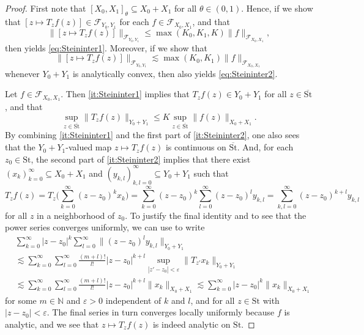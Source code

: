 \documentclass{amsart}
\newcommand {\veps}{\varepsilon}
\newcommand {\F}{\mathcal{F}}
\newcommand {\N}{{\mathbb N}}
\newcommand {\St}{{\mathrm{St}}}
\theoremstyle{definition}
\numberwithin{equation}{section}
\begin{document}
\begin{proof}
First note that $[X_{0},X_{1}]_{\theta}\subseteq X_{0}+X_{1}$ for all $\theta\in(0,1)$. Hence, if we show that $[z\mapsto T_{z}f(z)]\in \F_{Y_{0},Y_{1}}$ for each $f\in\F_{X_{0},X_{1}}$, and that
\[
\|[z\mapsto T_{z}f(z)]\|_{\F_{Y_{0},Y_{1}}}\leq \max(K_{0},K_{1},K)\|f\|_{\F_{X_{0},X_{1}}},
\] 
then \cite[Lemma 2.2]{Kalton-Mitrea98} yields \eqref{eq:Steininter1}. Moreover, if we show that 
\[
\|[z\mapsto T_{z}f(z)]\|_{\F_{Y_{0},Y_{1}}}\lesssim \max(K_{0},K_{1})\|f\|_{\F_{X_{0},X_{1}}}
\]
whenever $Y_{0}+Y_{1}$ is analytically convex, then \cite[Lemma 2.2]{Kalton-Mitrea98} also yields \eqref{eq:Steininter2}.

Let $f\in\F_{X_{0},X_{1}}$. Then \eqref{it:Steininter1} implies that $T_{z}f(z)\in Y_{0}+Y_{1}$ for all $z\in\overline{\St}$, and that 
\begin{equation}\label{eq:Steininter3}
\sup_{z\in\overline{\St}}\|T_{z}f(z)\|_{Y_{0}+Y_{1}}\leq K\sup_{z\in\overline{\St}}\|f(z)\|_{X_{0}+X_{1}}.
\end{equation}
By combining \eqref{it:Steininter1} and the first part of \eqref{it:Steininter2}, one also sees that the $Y_{0}+Y_{1}$-valued map $z\mapsto T_{z}f(z)$ is continuous on $\overline{\St}$. And, for each $z_{0}\in\St$, the second part of \eqref{it:Steininter2} implies that there exist $(x_{k})_{k=0}^{\infty}\subseteq X_{0}+X_{1}$ and $(y_{k,l})_{k,l=0}^{\infty}\subseteq Y_{0}+Y_{1}$ such that 
\[
T_{z}f(z)=T_{z}\Big(\sum_{k=0}^{\infty}(z-z_{0})^{k}x_{k}\Big)=\sum_{k=0}^{\infty}(z-z_{0})^{k}\sum_{l=0}^{\infty}(z-z_{0})^{l}y_{k,l}=\sum_{k,l=0}^{\infty}(z-z_{0})^{k+l}y_{k,l}
\]
for all $z$ in a neighborhood of $z_{0}$. {{To justify the final identity and to see that the power series converges uniformly, we can use \cite[Proposition 3.1]{Kalton-Mitrea98} to write %
\begin{align*}
&\sum_{k=0}^{\infty}|z-z_{0}|^{k}\sum_{l=0}^{\infty}\|(z-z_{0})^{l}y_{k,l}\|_{Y_{0}+Y_{1}}\\
&\lesssim \sum_{k=0}^{\infty}\sum_{l=0}^{\infty}\frac{(m+l)!}{l!}|z-z_{0}|^{k+l}\sup_{|z'-z_{0}|<\veps}\|T_{z'}x_{k}\|_{Y_{0}+Y_{1}}\\
&\lesssim \sum_{k=0}^{\infty}\sum_{l=0}^{\infty}\frac{(m+l)!}{l!}|z-z_{0}|^{k+l}\|x_{k}\|_{X_{0}+X_{1}}\lesssim \sum_{k=0}^{\infty}|z-z_{0}|^{k}\|x_{k}\|_{X_{0}+X_{1}}
\end{align*}
for some $m\in\N$ and $\veps>0$ independent of $k$ and $l$, and for all $z\in\St$ with $|z-z_{0}|<\veps$. The final series in turn converges locally uniformly because $f$ is analytic, and we see that $z\mapsto T_{z}f(z)$ is indeed analytic on $\St$.}}



\end{proof}
\end{document}
